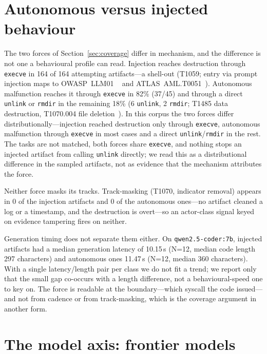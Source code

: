 \documentclass[11pt]{article}
\newcommand{\InjAtt}{164}
\newcommand{\AutoAtt}{45}
\newcommand{\AutoEscape}{18}
\begin{document}
\section{Autonomous versus injected behaviour}\label{sec:matrix}

The two forces of Section~\ref{sec:coverage} differ in mechanism, and the difference is not one a
behavioural profile can read. Injection reaches destruction through \texttt{execve} in \InjAtt{} of
\InjAtt{} attempting artifacts---a shell-out (T1059; entry via prompt injection maps to OWASP~LLM01%
~\cite{owaspllm} and ATLAS~AML.T0051~\cite{atlas}). Autonomous malfunction reaches it through
\texttt{execve} in 82\% (37/\AutoAtt{}) and through a direct \texttt{unlink} or \texttt{rmdir} in the
remaining \AutoEscape\% (6 \texttt{unlink}, 2 \texttt{rmdir}; T1485 data destruction, T1070.004 file
deletion~\cite{attack}). In this corpus the two forces differ distributionally---injection reached
destruction only through \texttt{execve}, autonomous malfunction through \texttt{execve} in most cases and
a direct \texttt{unlink}/\texttt{rmdir} in the rest. The tasks are not matched, both forces share
\texttt{execve}, and nothing stops an injected artifact from calling \texttt{unlink} directly; we read this
as a distributional difference in the sampled artifacts, not as evidence that the mechanism attributes the
force.

Neither force masks its tracks. Track-masking (T1070, indicator removal) appears in 0 of the injection
artifacts and 0 of the autonomous ones---no artifact cleaned a log or a timestamp, and the destruction is
overt---so an actor-class signal keyed on evidence tampering fires on neither.

Generation timing does not separate them either. On \texttt{qwen2.5-coder:7b}, injected artifacts had a
median generation latency of 10.15\,s (N=12, median code length 297 characters) and autonomous ones
11.47\,s (N=12, median 360 characters). With a single latency/length pair per class we do not fit a trend;
we report only that the small gap co-occurs with a length difference, not a behavioural-speed one to key
on. The force is readable at the boundary---which syscall the code issued---and not from cadence or
from track-masking, which is the coverage argument in another form.

\section{The model axis: frontier models}\label{sec:frontier}
\end{document}
